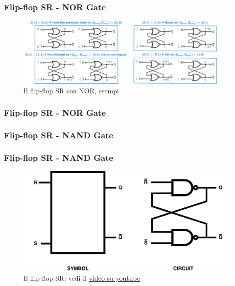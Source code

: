 \begin{frame}
	\frametitle{Flip-flop SR - NOR Gate}
	 
	\begin{figure}[!htbp] 
		\centering
		\includegraphics[width=1.0\linewidth]{images/5_memory/flip_flop_sr_nor.png}
		\caption{Il flip-flop SR con NOR, esempi}
	\end{figure}
	
\end{frame}

\begin{frame}

	\frametitle{Flip-flop SR - NOR Gate}

		\centering
		\label{fig:flip_flop_sr_nor}

\end{frame}


\subsubsection[Flip-flop SR - NAND Gate]{Flip-flop SR - NAND Gate}
\begin{frame}
	\frametitle{Flip-flop SR - NAND Gate}
	 
	\begin{figure}[!htbp]  
		\centering
		\includegraphics[width=0.95\linewidth]{images/5_memory/flip_flop_sr_nand.pdf}
		\caption{Il flip-flop SR: vedi il \underline{\href{https://www.youtube.com/watch?v=Y9k2oiSJkz4}{video su youtube}}}
	\end{figure}
	
\end{frame}


